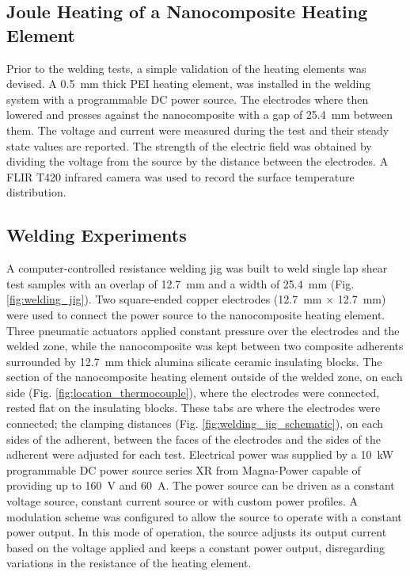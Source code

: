 \documentclass[11pt,review,times]{elsarticle}
\begin{document}
\subsection{Joule Heating of a Nanocomposite Heating Element}

Prior to the welding tests, a simple validation of the heating elements was devised. 
A \SI{0.5}{\milli\metre} thick PEI heating element, was installed in the welding system with a programmable DC power source. 
The electrodes where then lowered and presses against the nanocomposite with a gap of \SI{25.4}{\mm} between them. 
The voltage and current were measured during the test and their steady state values are reported. 
The strength of the electric field was obtained by dividing the voltage from the source by the distance between the electrodes. 
A FLIR T420 infrared camera was used to record the surface temperature distribution. 

\subsection{Welding Experiments}

A computer-controlled resistance welding jig was built to weld single lap shear test samples with an overlap of \SI{12.7}{\milli\metre} and a width of \SI{25.4}{\milli\metre} (Fig. \ref{fig:welding_jig}). 
Two square-ended copper electrodes (\SI{12.7}{\milli\metre} $\times$ \SI{12.7}{\milli\metre}) were used to connect the power source to the nanocomposite heating element. 
Three pneumatic actuators applied constant pressure over the electrodes and the welded zone, while the nanocomposite was kept between two composite adherents surrounded by \SI{12.7}{\milli\metre} thick alumina silicate ceramic insulating blocks. 
The section of the nanocomposite heating element outside of the welded zone, on each side (Fig. \ref{fig:location_thermocouple}), where the electrodes were connected, rested flat on the insulating blocks. 
These tabs are where the electrodes were connected; the clamping distances (Fig. \ref{fig:welding_jig_schematic}), on each sides of the adherent, between the faces of the electrodes and the sides of the adherent were adjusted for each test. 
Electrical power was supplied by a \SI{10}{\kW} programmable DC power source series XR from Magna-Power capable of providing up to \SI{160}{\volt} and \SI{60}{\ampere}. 
The power source can be driven as a constant voltage source, constant current source or with custom power profiles. 
A modulation scheme was configured to allow the source to operate with a constant power output. 
In this mode of operation, the source adjusts its output current based on the voltage applied and keeps a constant power output, disregarding variations in the resistance of the heating element. 
\end{document}
